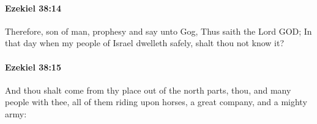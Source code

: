 		\paragraph{Ezekiel 38:14} %
			\label{EZEKIEL-38-14}

			Therefore, son of man, prophesy and say unto Gog, Thus saith the Lord GOD; In that day when my people of Israel dwelleth safely, shalt thou not know it?


		\paragraph{Ezekiel 38:15} %
			\label{EZEKIEL-38-15}

			And thou shalt come from thy place out of the north parts, thou, and many people with thee, all of them riding upon horses, a great company, and a mighty army:


